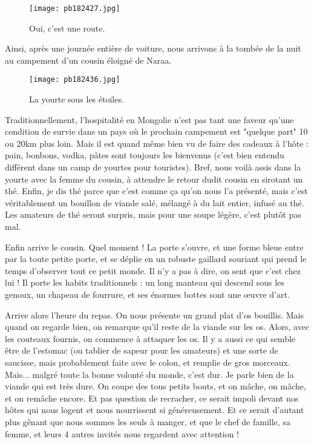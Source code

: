 \documentclass{book}
\begin{document}
\begin{figure}[h]
\centering
\texttt{[image: pb182427.jpg]}
\caption*{ Oui, c'est une route.}
\end{figure}

Ainsi, après une journée entière de voiture, nous arrivons à la tombée de la nuit au campement d'un cousin éloigné de Naraa.


\begin{figure}[h]
\centering
\texttt{[image: pb182436.jpg]}
\caption*{ La yourte sous les étoiles.}
\end{figure}

Traditionnellement, l'hospitalité en Mongolie n'est pas tant une faveur qu'une condition de survie dans un pays où le prochain campement est "quelque part" 10 ou 20km plus loin. Mais il est quand même bien vu de faire des cadeaux à l'hôte : pain, bonbons, vodka, pâtes sont toujours les bienvenus (c'est bien entendu différent dans un camp de yourtes pour touristes). Bref, nous voilà assis dans la yourte avec la femme du cousin, à attendre le retour dudit cousin en sirotant un thé. Enfin, je dis thé parce que c'est comme ça qu'on nous l'a présenté, mais c'est véritablement un bouillon de viande salé, mélangé à du lait entier, infusé au thé. Les amateurs de thé seront surpris, mais pour une soupe légère, c'est plutôt pas mal.

Enfin arrive le cousin. Quel moment ! La porte s'ouvre, et une forme bleue entre par la toute petite porte, et se déplie en un robuste gaillard souriant qui prend le temps d'observer tout ce petit monde. Il n'y a pas à dire, on sent que c'est chez lui ! Il porte les habits traditionnels : un long manteau qui descend sous les genoux, un chapeau de fourrure, et ses énormes bottes sont une œuvre d'art.



Arrive alors l'heure du repas. On nous présente un grand plat d'os bouillis. Mais quand on regarde bien, on remarque qu'il reste de la viande sur les os. Alors, avec les couteaux fournis, on commence à attaquer les os. Il y a aussi ce qui semble être de l'estomac (ou tablier de sapeur pour les amateurs) et une sorte de saucisse, mais probablement faite avec le colon, et remplie de gros morceaux. Mais... malgré toute la bonne volonté du monde, c'est dur. Je parle bien de la viande qui est très dure. On coupe des tous petits bouts, et on mâche, on mâche, et on remâche encore. Et pas question de recracher, ce serait impoli devant nos hôtes qui nous logent et nous nourrissent si généreusement. Et ce serait d'autant plus gênant que nous sommes les seuls à manger, et que le chef de famille, sa femme, et leurs 4 autres invités nous regardent avec attention !
\end{document}
